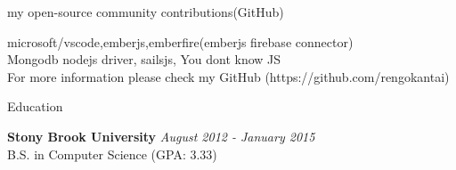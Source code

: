 \documentclass{resume} %
\begin{document}
\begin{rSection}{my open-source community contributions(GitHub)}

microsoft/vscode,emberjs,emberfire(emberjs firebase connector) \\
Mongodb nodejs driver,  sailsjs, You dont know JS \\
For more information please check my GitHub (https://github.com/rengokantai)


\end{rSection}














\begin{rSection}{Education}

{\bf Stony Brook University} \hfill {\em August 2012 - January 2015} \\ 
B.S. in Computer Science (GPA: 3.33)  \\
\end{rSection}
\end{document}
